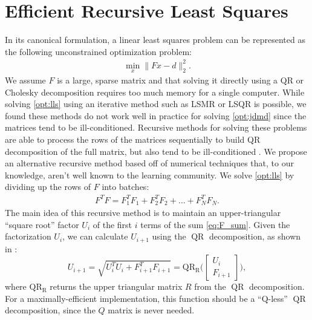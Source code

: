 \documentclass{article}
\begin{document}
\section{Efficient Recursive Least Squares} \label{sec:rls}
In its canonical formulation, a linear least squares problem can be represented as the
following unconstrained optimization problem:
\begin{align} \label{opt:lls}
  \min_x \|Fx - d\|_2^2.
\end{align}
We assume $F$ is a large, sparse matrix and that solving it directly using a QR or Cholesky
decomposition requires too much memory for a single computer. While solving \eqref{opt:lls}
using an iterative method such as LSMR \cite{Fong2011} or LSQR \cite{Paige1982} is possible,
we found these methods do not work well in practice for solving \eqref{opt:jdmd} since the 
matrices tend to be ill-conditioned. Recursive methods for solving these problems are able
to process the rows of the matrices sequentially to build QR decomposition of the full
matrix, but also tend to be ill-conditioned \cite{Strobach1990,Sayed2009,Ghirnikar1990}. We
propose an alternative recursive method based off of numerical techniques that, to our
knowledge, aren't well known to the learning community. We solve \eqref{opt:lls} by dividing
up the rows of $F$ into batches:
\begin{align} \label{eq:F_sum}
  F^T F = F_1^T F_1 + F_2^T F_2 + \ldots + F_N^T F_N.
\end{align}
The main idea of this recursive method is to maintain an upper-triangular ``square root''
factor $U_i$ of the first $i$ terms of the sum \eqref{eq:F_sum}. Given the factorization 
$U_i$, we can calculate $U_{i+1}$ using the $\operatorname{QR}$ decomposition, as shown in
\cite{Howell2019}:
\begin{equation}
  U_{i+1} = \sqrt{U_i^TU_i + F_{i+1}^TF_{i+1}} = 
  \operatorname{QR_R}\bigg( \begin{bmatrix} {U_i} \\ {F_{i+1}} \end{bmatrix} \bigg),
\end{equation}
where $\operatorname{QR_R}$ returns the upper triangular matrix $R$ from the 
$\operatorname{QR}$ decomposition. For a maximally-efficient implementation, this function 
should be a ``Q-less'' $\operatorname{QR}$ decomposition, since the $Q$ matrix is never 
needed.
\end{document}
